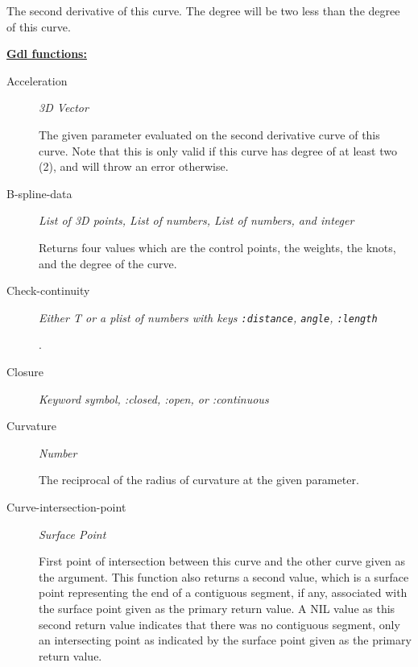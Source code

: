 \documentclass [11pt]{book}
\begin{document}
\begin{itemize}
\begin{description}
 The second derivative of this curve. The degree will be two less than the degree of this curve.




\end{description}






\textbf{
\underline{Gdl functions:}}

\begin{description}

\item [Acceleration]
\emph{3D Vector}

 The given parameter evaluated on the second derivative curve of this curve. Note that this is
only valid if this curve has degree of at least two (2), and will throw an error otherwise.




\item [B-spline-data]
\emph{List of 3D points, List of numbers, List of numbers, and integer}

 Returns four values which are
the control points, the weights, the knots, and the degree of the curve.




\item [Check-continuity]
\emph{Either T or a plist of numbers with keys \texttt{:distance}, \texttt{angle}, \texttt{:length}}

.




\item [Closure]
\emph{Keyword symbol, :closed, :open, or :continuous}





\item [Curvature]
\emph{Number}

 The reciprocal of the radius of curvature at the given parameter.




\item [Curve-intersection-point]
\emph{Surface Point}

  First point of intersection between this curve and the other curve given as the argument.
This function also returns a second value, which is a surface point representing the end of
a contiguous segment, if any, associated with the surface point given as the primary return value.
A NIL value as this second return value indicates that there was no contiguous segment, only an
intersecting point as indicated by the surface point given as the primary return value.





\end{description}
\end{itemize}
\end{document}

